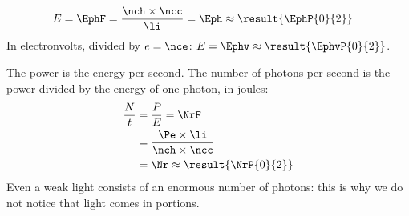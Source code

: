 \begin{abcliste}
\abc
\begin{align}
 E &= \EphF = \frac{\nch\times\ncc}{\li} = \Eph \approx \result{\EphP{0}{2}}
\end{align}
In electronvolts, divided by $e = \nce$: $E = \Ephv \approx \result{\EphvP{0}{2}}$.

\abc The power is the energy per second. The number of photons per second is the power divided by the energy of one photon, in joules:
\begin{align}
 \frac{N}{t} &= \frac{P}{E} = \NrF \\
   &= \frac{\Pe\times\li}{\nch\times\ncc} \\
   &= \Nr \approx \result{\NrP{0}{2}}
\end{align}
Even a weak light consists of an enormous number of photons: this is why we do not notice that light comes in portions.
\end{abcliste}
